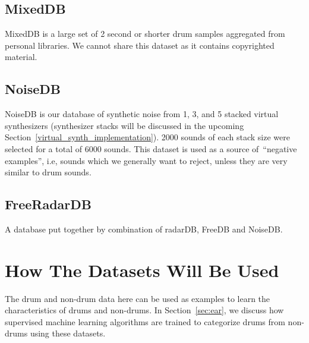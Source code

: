 \documentclass[\main/thesis.tex]{subfiles}
\begin{document}
\subsection{MixedDB}
MixedDB is a large set of 2 second or shorter drum samples aggregated from personal libraries. We cannot share this dataset as it contains copyrighted material. 
\subsection{NoiseDB}
NoiseDB is our database of synthetic noise from 1, 3, and 5 stacked virtual synthesizers (synthesizer stacks will be discussed in the upcoming Section~\ref{virtual_synth_implementation}). 2000 sounds of each stack size were selected for a total of 6000 sounds.  This dataset is used as a source of~\enquote{negative examples}, i.e, sounds which we generally want to reject, unless they are very similar to drum sounds.
\subsection{FreeRadarDB}
\label{db:memDB}
A database put together by combination of radarDB, FreeDB and NoiseDB.

\section{How The Datasets Will Be Used}
 The drum and non-drum data here can be used as examples to learn the characteristics of drums and non-drums. In Section~\ref{sec:ear}, we discuss how supervised machine learning algorithms are trained to categorize drums from non-drums using these datasets.  
  
\end{document}

